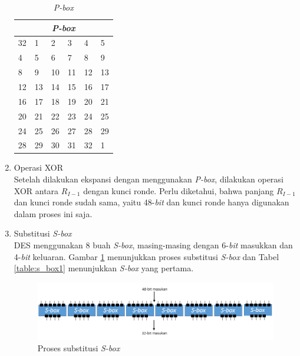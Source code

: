 \begin{enumerate}
\begin{table}
	\begin{center}
		\begin{tabular}{|l|l|l|l|l|l|}
				\hline
				\multicolumn{6}{|c|}{\textit{P-box}} \\
				\hline
				32 	& 1		& 2 	& 3 	& 4 	& 5		\\ \hline
				4 	& 5		& 6 	& 7 	& 8 	& 9		\\ \hline
				8 	& 9		& 10 	& 11 	& 12 	& 13	\\ \hline
				12 	& 13	& 14 	& 15 	& 16 	& 17	\\ \hline
				16 	& 17	& 18 	& 19 	& 20 	& 21	\\ \hline
				20 	& 21	& 22 	& 23 	& 24 	& 25	\\ \hline
				24 	& 25	& 26 	& 27 	& 28 	& 29	\\ \hline
				28 	& 29	& 30 	& 31 	& 32 	& 1		\\ \hline
		\end{tabular}
	\end{center}
	\caption{\textit{P-box}}\label{table:Pbox}
\end{table}

	\item Operasi XOR\\
	Setelah dilakukan ekspansi dengan menggunakan \textit{P-box}, dilakukan operasi XOR antara \begin{math}R_{I-1}\end{math} dengan kunci ronde. Perlu diketahui, bahwa panjang \begin{math}R_{I-1}\end{math} dan kunci ronde sudah sama, yaitu 48-\textit{bit} dan kunci ronde hanya digunakan dalam proses ini saja.

	\item Substitusi \textit{S-box}\\
	DES menggunakan 8 buah \textit{S-box}, masing-masing dengan 6-\textit{bit} masukkan dan 4-\textit{bit} keluaran. Gambar \ref{fig:substitusi_s_box} menunjukkan proses substitusi \textit{S-box} dan Tabel \ref{table:s_box1} menunjukkan \textit{S-box} yang pertama.
	
\begin{figure}[h]
	\includegraphics[scale=0.5]{Gambar/S-box}
	\centering
	\caption{Proses substitusi \textit{S-box}}\label{fig:substitusi_s_box}
\end{figure}


\end{enumerate}

